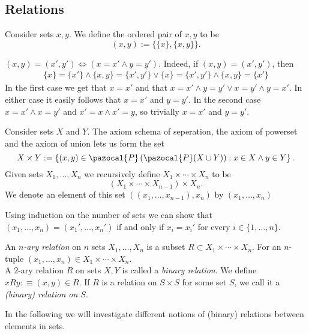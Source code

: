 \subsection{Relations}
\begin{definition}
    Consider sets $x,y$. We define the ordered pair of $x,y$ to be 
    $$(x,y) := \{\{x\},\{x,y\}\}.$$
\end{definition}
\begin{remark}
    $(x,y)=(x',y')\iff (x=x' \wedge y=y')$. Indeed, if $(x,y)=(x',y')$, then 
    \begin{gather*} \{x\} = \{x'\} \wedge \{x,y\} = \{x',y'\} \vee \{x\} = \{x',y'\} \wedge \{x,y\} = \{x'\} 
    \end{gather*}
    In the first case we get that $x=x'$ and that $x=x' \wedge y = y'\vee x= y'\wedge y=x'$. In either case it easily follows that $x=x'$ and $y=y'$. In the second case $x=x' \wedge x=y'$ and $x' = x\wedge x' = y$, so trivially $x=x'$ and $y=y'$. 
\end{remark}
\begin{definition}
    Consider sets $X$ and $Y$. The axiom schema of seperation, the axiom of powerset and the axiom of union lets us form the set
    $$X\times Y := \left\{ (x,y)\in \pazocal{P}\left(\pazocal{P}(X\cup Y)\right) : x\in X \wedge y\in Y\right\}.$$ 
    Given sets $X_1,\dots,X_n$ we recursively define $X_1\times \cdots \times X_n$ to be 
    $$(X_1\times \cdots \times X_{n-1})\times X_n.$$
    We denote an element of this set $((x_1,\dots,x_{n-1}),x_n)$ by $(x_1,\dots,x_n)$
\end{definition}
\begin{remark}
    Using induction on the number of sets we can show that $(x_1,\dots,x_n)=(x_1',\dots,x_n')$ if and only if $x_i=x_i'$ for every $i\in\{1,\dots,n\}$.  
\end{remark}
\begin{definition}
    An \textit{$n$-ary relation} on $n$ sets $X_1,\dots,X_n$ is a subset $R\subset X_1\times \cdots\times X_n$. For an $n$-tuple $(x_1,\dots,x_n)\in X_1\times\cdots\times  X_n$.\\ 
    A $2$-ary relation $R$ on sets $X,Y$ is called a \emph{binary relation}. We define $xRy: \equiv (x,y)\in R$. If $R$ is a relation on $S\times S$ for some set $S$, we call it a \textit{(binary) relation on $S$}.
\end{definition}
In the following we will investigate different notions of (binary) relations between elements in sets. 
